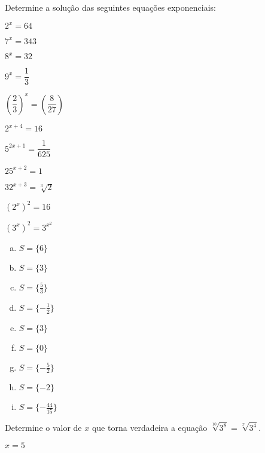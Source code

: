 \begin{secExercicios}
\begin{exer}
 Determine a solução das seguintes equações exponenciais:
 \begin{enumerate}[a)]
 \begin{multicols}{2}
 \item $2^x= 64$
 \item $7^x= 343$
 \item $8^x= 32$
 \item $9^x= \dfrac{1}{3}$
 \item $\left( \dfrac{2}{3} \right)^x= \left( \dfrac{8}{27} \right)$
 \item $2^{x+4}= 16$
 \item $5^{2x+1}= \dfrac{1}{625}$
 \item $25^{x+2}= 1$
 \item $32^{x+3}= \sqrt[3]{2}$
 \item $(2^x)^2=16$
 \item $(3^x)^2=3^{x^2}$
 \end{multicols}
 \end{enumerate}
 \end{exer}
 \begin{resp}
 \begin{multicols}{3}
   \begin{enumerate}[a)]
 \item $S= \{ 6 \}$
 \item $S= \{ 3 \}$
 \item $S= \{\frac{5}{3} \}$
 \item $S= \{ -\frac{1}{2} \}$
 \item $S= \{ 3 \}$
 \item $S= \{ 0 \}$
 \item $S= \{-\frac{5}{2} \}$
 \item $S= \{ -2 \}$
 \item $S= \{ - \frac{44}{15} \}$
 \end{enumerate}
 \end{multicols}
 \end{resp}

 \begin{exer}
Determine o valor de $x$ que torna verdadeira a equação $\sqrt[10]{3^8}= \sqrt[x]{3^4}$.
\end{exer}
\begin{resp}
  $x= 5$
\end{resp}
 

\end{secExercicios}
